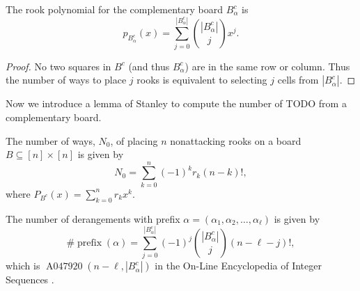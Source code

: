 \begin{lemma}
  The rook polynomial for the complementary board $B_\alpha^c$ is \begin{equation}
    p_{B_\alpha^c}(x) = \sum_{j = 0}^{|B_\alpha^c|} \binom{|B_\alpha^c|}{j}x^j.
  \end{equation}
\end{lemma}
\begin{proof}
  No two squares in $B^c$ (and thus $B^c_\alpha$) are in the same row or column.
  Thus the number of ways to place $j$ rooks is equivalent to selecting $j$
  cells from $|B^c_\alpha|$.
\end{proof}

Now we introduce a lemma of Stanley \cite{Stanley2011EC1} to compute the number
of TODO from a complementary board.

\begin{lemma}
  The number of ways, $N_0$, of placing $n$ nonattacking rooks on a board
  $B \subseteq [n] \times [n]$ is given by \[
    N_0 = \sum_{k=0}^n (-1)^k r_k (n-k)!,
  \] where $P_{B^c}(x) = \sum_{k=0}^n r_k x^k$.
  \label{lemma:CountsFromComplementaryPolynomials}
\end{lemma}

\begin{corollary}
  The number of derangements with prefix
  $\alpha = (\alpha_1, \alpha_2, \dots, \alpha_\ell)$
  is given by \[
    \#\operatorname{prefix}(\alpha)
    = \sum_{j=0}^{|B_\alpha^c|} (-1)^j \binom{|B_\alpha^c|}{j}(n-\ell-j)!,
  \] which is $\operatorname{A047920}(n-\ell, |B_\alpha^c|)$ in
  the On-Line Encyclopedia of Integer Sequences \cite{oeis}.
\end{corollary}

